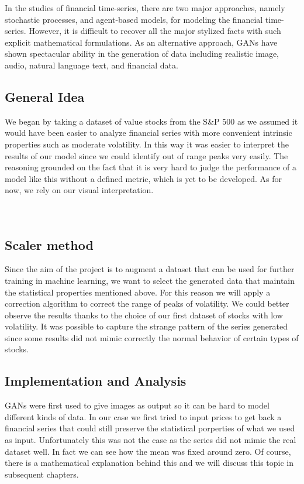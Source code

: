 \documentclass{article}
\begin{document}
    \begin{multicols}{2}

    In the studies of financial time-series, there are two major approaches, namely stochastic processes, and agent-based models, for modeling the financial time-series. However, it is difficult to recover all the major stylized facts with such explicit mathematical formulations. As an alternative approach, GANs have shown spectacular ability in the generation of data including realistic image, audio, natural language text, and financial data.\\
    
    \subsection*{General Idea}
    We began by taking a dataset of value stocks from the S\&P 500 as we assumed it would have been easier to analyze financial series with more convenient intrinsic properties such as moderate volatility. In this way it was easier to interpret the results of our model since we could identify out of range peaks very easily. The reasoning grounded on the fact that it is very hard to judge the performance of a model like this without a defined metric, which is yet to be developed. As for now, we rely on our visual interpretation.\\ \\ \\
    
    \subsection*{Scaler method}
    Since the aim of the project is to augment a dataset that can be used for further training in machine learning, we want to select the generated data that maintain the statistical properties mentioned above. For this reason we will apply a correction algorithm to correct the range of peaks of volatility. We could better observe the results thanks to the choice of our first dataset of stocks with low volatility. It was possible to capture the strange pattern of the series generated since some results did not mimic correctly the normal behavior of certain types of stocks.\\ 
    
    \subsection*{Implementation and Analysis}
    GANs were first used to give images as output so it can be hard to model different kinds of data. In our case we first tried to input prices to get back a financial series that could still preserve the statistical porperties of what we used as input. Unfortunately this was not the case as the series did not mimic the real dataset well. In fact we can see how the mean was fixed around zero. Of course, there is a mathematical explanation behind this and we will discuss this topic in subsequent chapters.\\
    

\end{multicols}
\end{document}
